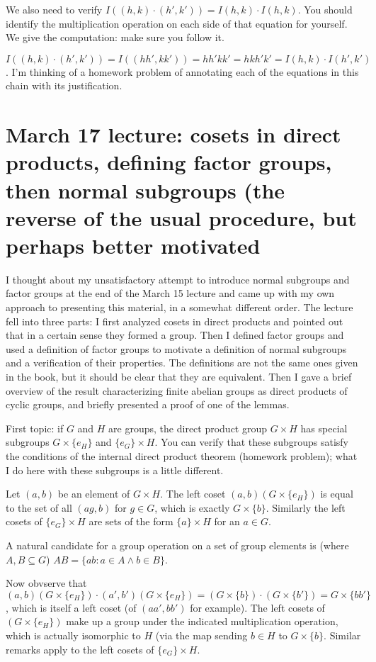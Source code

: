 \documentclass[12pt]{article}
\begin{document}
We also need to verify $I((h,k)\cdot(h',k')) = I(h,k)\cdot I(h,k)$.  You should identify the multiplication operation on each side of that equation for yourself.  We give the computation:  make sure you follow it.

$I((h,k)\cdot(h',k')) = I((hh',kk')) = hh'kk' = hkh'k' = I(h,k)\cdot I(h',k')$.  I'm thinking of a homework problem of annotating each of the equations in this chain with its justification.

\section{March 17 lecture:  cosets in direct products, defining factor groups, then normal subgroups (the reverse of the usual procedure, but perhaps better motivated}

I thought about my unsatisfactory attempt to introduce normal subgroups and factor groups at the end of the March 15 lecture and came up with my own approach to presenting this material, in a somewhat different order.  The lecture fell into three parts:  I first analyzed cosets in direct products and pointed out that in a certain sense they formed a group.  Then I defined factor groups and used a definition of factor groups to motivate a definition of normal subgroups and a verification of their properties.  The definitions are not the same ones given in the book, but it should be clear that they are equivalent.  Then I gave a brief overview of the result characterizing finite abelian groups as direct products of cyclic groups, and briefly presented a proof of one of the lemmas.

First topic:  if  $G$ and $H$ are groups, the direct product group $G \times H$ has special subgroups $G \times \{e_H\}$ and $\{e_G\} \times H$.  You can verify that these subgroups satisfy the conditions of the internal direct product theorem (homework problem);  what I do here with these subgroups is a little different.

Let $(a,b)$ be an element of $G \times H$.  The left coset $(a,b)(G \times \{e_H\})$ is equal to the set of all
$(ag,b)$ for $g \in G$, which is exactly $G \times \{b\}$.  Similarly the left cosets of $\{e_G\} \times H$ are sets
of the form $\{a\} \times H$ for an $a \in G$.

A natural candidate for a group operation on a set of group elements is (where $A,B \subseteq G$) $AB = \{ab:a \in A \wedge b \in B\}$.

Now obvserve that $(a,b)(G \times \{e_H\}) \cdot (a',b')(G \times \{e_H\}) = (G \times \{b\})\cdot (G \times \{b'\}) = G \times \{bb'\}$, which is itself a left coset (of $(aa',bb')$ for example).  The left cosets of $(G \times \{e_H\})$ make up a group under the indicated multiplication operation, which is actually isomorphic to $H$ (via the map sending $b \in H$ to $G \times \{b\}$.  Similar remarks apply to the left cosets of $\{e_G\} \times H$.
\end{document}
